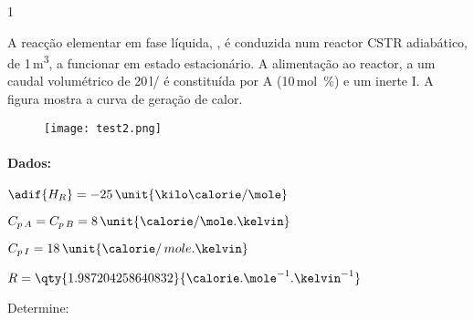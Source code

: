 \documentclass[\mainfilename]{subfiles}
\begin{document}
\begin{questionBox}1{ %
    A reacção elementar em fase líquida, , é conduzida num reactor CSTR adiabático, de 1\,\unit{\metre^3}, a funcionar em estado estacionário. A alimentação ao reactor, a um caudal volumétrico de 20\,\unit{\litre/\min} é constituída por A (10\,\unit{\mole\percent}) e um inerte I. A figura mostra a curva de geração de calor.
    \begin{figure}\centering
        \texttt{[image: test2.png]}
    \end{figure}
} %
    \paragraph*{Dados:}
    \begin{itemize}
        \begin{multicols}{2}
            \vspace{-2ex}
            \item \(\adif{H_R}=-25\,\unit{\kilo\calorie/\mole}\)
            \item \(C_{p\,A}=C_{p\,B}=8\,\unit{\calorie/\mole.\kelvin}\)
            \item \(C_{p\,I}=18\,\unit{\calorie/\,mole.\kelvin}\)
            \item \(R=\qty{1.987204258640832}{\calorie.\mole^{-1}.\kelvin^{-1}}\)
        \end{multicols}
    \end{itemize}
    Determine:


\end{questionBox}
\end{document}
